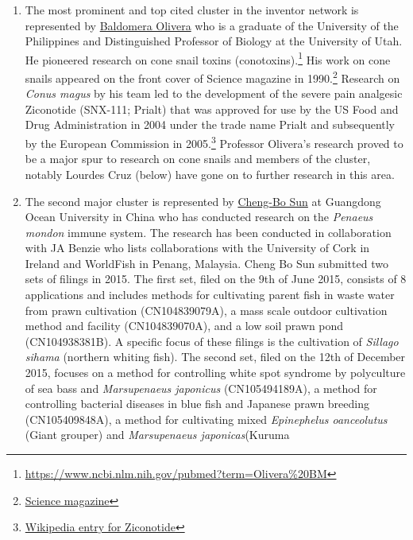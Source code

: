 \documentclass[]{book}
\theoremstyle{definition}
\theoremstyle{definition}
\theoremstyle{definition}
\theoremstyle{remark}
\begin{document}
\begin{enumerate}
\def\labelenumi{\arabic{enumi}.}
\item
  The most prominent and top cited cluster in the inventor network is
  represented by
  \href{https://en.wikipedia.org/wiki/Baldomero_Olivera}{Baldomera
  Olivera} who is a graduate of the University of the Philippines and
  Distinguished Professor of Biology at the University of Utah. He
  pioneered research on cone snail toxins (conotoxins).\footnote{\url{https://www.ncbi.nlm.nih.gov/pubmed?term=Olivera\%20BM}}
  His work on cone snails appeared on the front cover of Science
  magazine in 1990.\footnote{\href{http://science.sciencemag.org/content/249/4966}{Science
    magazine}} Research on \emph{Conus magus} by his team led to the
  development of the severe pain analgesic Ziconotide (SNX-111; Prialt)
  that was approved for use by the US Food and Drug Administration in
  2004 under the trade name Prialt and subsequently by the European
  Commission in 2005.\footnote{\href{https://en.wikipedia.org/wiki/Ziconotide}{Wikipedia
    entry for Ziconotide}} Professor Olivera's research proved to be a
  major spur to research on cone snails and members of the cluster,
  notably Lourdes Cruz (below) have gone on to further research in this
  area.
\item
  The second major cluster is represented by
  \href{https://www.researchgate.net/scientific-contributions/2040070693_Cheng-Bo_Sun}{Cheng-Bo
  Sun} at Guangdong Ocean University in China who has conducted research
  on the \emph{Penaeus mondon} immune system. The research has been
  conducted in collaboration with JA Benzie who lists collaborations
  with the University of Cork in Ireland and WorldFish in Penang,
  Malaysia. Cheng Bo Sun submitted two sets of filings in 2015. The
  first set, filed on the 9th of June 2015, consists of 8 applications
  and includes methods for cultivating parent fish in waste water from
  prawn cultivation (CN104839079A), a mass scale outdoor cultivation
  method and facility (CN104839070A), and a low soil prawn pond
  (CN104938381B). A specific focus of these filings is the cultivation
  of \emph{Sillago sihama} (northern whiting fish). The second set,
  filed on the 12th of December 2015, focuses on a method for
  controlling white spot syndrome by polyculture of sea bass and
  \emph{Marsupenaeus japonicus} (CN105494189A), a method for controlling
  bacterial diseases in blue fish and Japanese prawn breeding
  (CN105409848A), a method for cultivating mixed \emph{Epinephelus
  oanceolutus} (Giant grouper) and \emph{Marsupenaeus japonicas}(Kuruma

\end{enumerate}
\end{document}
